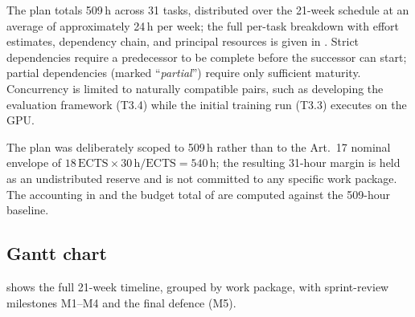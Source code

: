 The plan totals 509\,h across 31 tasks, distributed over the
21-week schedule at an average of approximately 24\,h per week;
the full per-task breakdown with effort estimates, dependency
chain, and principal resources is given in .
Strict dependencies require a predecessor to be complete before
the successor can start; partial dependencies (marked
``\textit{partial}'') require only sufficient maturity.
Concurrency is limited to naturally compatible pairs, such as
developing the evaluation framework (T3.4) while the initial
training run (T3.3) executes on the GPU.

The plan was deliberately scoped to 509\,h rather than to the
Art.~17 nominal envelope of $18\,\text{ECTS} \times 30\,\text{h/ECTS}
= 540\,\text{h}$; the resulting 31-hour margin is held as an
undistributed reserve and is not committed to any specific work
package.
The accounting in  and the budget total of
 are computed against the 509-hour
baseline.

\subsection{Gantt chart}

 shows the full 21-week timeline, grouped by work
package, with sprint-review milestones M1--M4 and the final defence
(M5).

